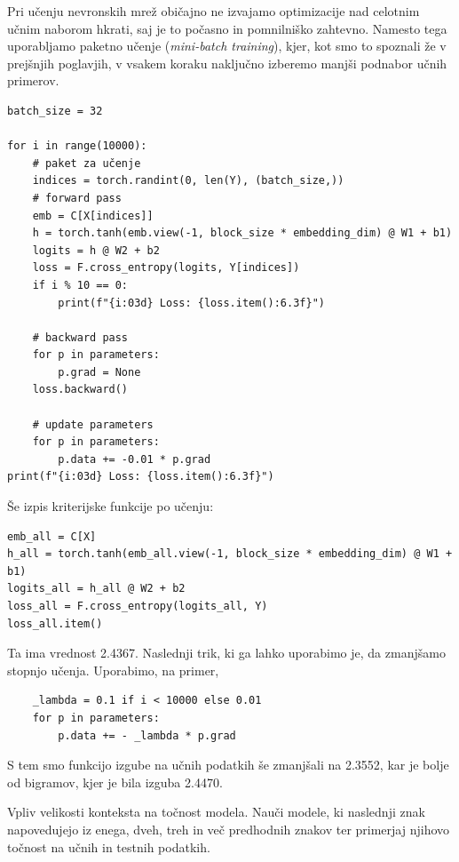 Pri učenju nevronskih mrež običajno ne izvajamo optimizacije nad celotnim učnim naborom hkrati, saj je to počasno in pomnilniško zahtevno. Namesto tega uporabljamo paketno učenje (\emph{mini-batch training}), kjer, kot smo to spoznali že v prejšnjih poglavjih,  v vsakem koraku naključno izberemo manjši podnabor učnih primerov.

\vspace*{3mm}
\begin{lstlisting}
batch_size = 32

for i in range(10000):
    # paket za učenje
    indices = torch.randint(0, len(Y), (batch_size,))
    # forward pass
    emb = C[X[indices]]
    h = torch.tanh(emb.view(-1, block_size * embedding_dim) @ W1 + b1)
    logits = h @ W2 + b2
    loss = F.cross_entropy(logits, Y[indices])
    if i % 10 == 0:
        print(f"{i:03d} Loss: {loss.item():6.3f}")

    # backward pass
    for p in parameters:
        p.grad = None
    loss.backward()

    # update parameters
    for p in parameters:
        p.data += -0.01 * p.grad
print(f"{i:03d} Loss: {loss.item():6.3f}")
\end{lstlisting}

Še izpis kriterijske funkcije po učenju:

\vspace*{3mm}
\begin{lstlisting}
emb_all = C[X]
h_all = torch.tanh(emb_all.view(-1, block_size * embedding_dim) @ W1 + b1)
logits_all = h_all @ W2 + b2
loss_all = F.cross_entropy(logits_all, Y) 
loss_all.item()
\end{lstlisting}

Ta ima vrednost 2.4367. Naslednji trik, ki ga lahko uporabimo je, da zmanjšamo stopnjo učenja. Uporabimo, na primer,

\vspace*{3mm}
\begin{lstlisting}
    _lambda = 0.1 if i < 10000 else 0.01
    for p in parameters:
        p.data += - _lambda * p.grad
\end{lstlisting}

S tem smo funkcijo izgube na učnih podatkih še zmanjšali na 2.3552, kar je bolje od bigramov, kjer je bila izguba 2.4470. 

\begin{exercise}{Vpliv velikosti konteksta na točnost modela.}
Nauči modele, ki naslednji znak napovedujejo iz enega, dveh, treh in več
predhodnih znakov ter primerjaj njihovo točnost na učnih in testnih podatkih.
\end{exercise}

